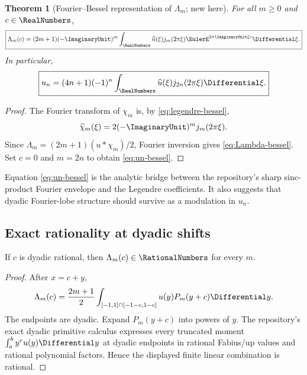 \documentclass[11pt,oneside]{article}
\numberwithin{equation}{section}
\newtheorem{theorem}{Theorem}[section]
\theoremstyle{definition}
\theoremstyle{remark}
\begin{document}
\begin{theorem}[Fourier--Bessel representation of $\Lambda_m$; new here]
\label{thm:Lambda-bessel}
For all $m\ge0$ and $c\in\RealNumbers$,
\begin{equation}
 \boxed{
 \Lambda_m(c)=(2m+1)(-\ImaginaryUnit)^m
 \int_{\RealNumbers}\widehat u(\xi)j_m(2\pi\xi)
 \EulerE^{2\pi\ImaginaryUnit\xi c}\Differential\xi.}
 \label{eq:Lambda-bessel}
\end{equation}
In particular,
\begin{equation}
 \boxed{
 u_n=(4n+1)(-1)^n
 \int_{\RealNumbers}\widehat u(\xi)j_{2n}(2\pi\xi)\Differential\xi.}
 \label{eq:un-bessel}
\end{equation}
\end{theorem}

\begin{proof}
The Fourier transform of $\chi_m$ is, by
\eqref{eq:legendre-bessel},
\[
 \widehat\chi_m(\xi)=2(-\ImaginaryUnit)^m j_m(2\pi\xi).
\]
Since $\Lambda_m=(2m+1)(u*\chi_m)/2$, Fourier inversion gives
\eqref{eq:Lambda-bessel}.  Set $c=0$ and $m=2n$ to obtain
\eqref{eq:un-bessel}.
\end{proof}

Equation \eqref{eq:un-bessel} is the analytic bridge between the repository's
sharp sinc-product Fourier envelope and the Legendre coefficients.  It also
suggests that dyadic Fourier-lobe structure should survive as a modulation in
$u_n$.

\subsection{Exact rationality at dyadic shifts}

\begin{proposition}
\label{prop:Lambda-rational}
If $c$ is dyadic rational, then $\Lambda_m(c)\in\RationalNumbers$ for every $m$.
\end{proposition}

\begin{proof}
After $x=c+y$,
\[
 \Lambda_m(c)=\frac{2m+1}{2}
 \int_{[-1,1]\cap[-1-c,1-c]}u(y)P_m(y+c)\Differential y.
\]
The endpoints are dyadic.  Expand $P_m(y+c)$ into powers of $y$.  The
repository's exact dyadic primitive calculus expresses every truncated moment
$\int_a^b y^r u(y)\Differential y$ at dyadic endpoints in rational Fabius/up values and
rational polynomial factors.  Hence the displayed finite linear combination
is rational.
\end{proof}
\end{document}
